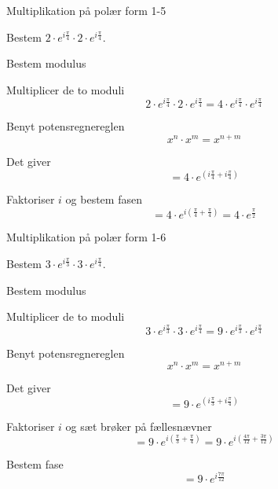 \documentclass{article}
\begin{document}
\newpage

\begin{exercise}{Multiplikation på polær form 1-5}
	
	Bestem $2 \cdot e^{i \frac{\pi}{4}} \cdot 2 \cdot e^{i \frac{\pi}{4}}$.
	
	
	
	\hint 
	
	Bestem modulus
	
	
	\hint
	
	Multiplicer de to moduli 
	\[
	2 \cdot e^{i \frac{\pi}{4}} \cdot 2 \cdot e^{i \frac{\pi}{4}} = 4 \cdot e^{i \frac{\pi}{4}} \cdot e^{i \frac{\pi}{4}}
	\]
	
	\hint 
	
	Benyt potensregnereglen
	\[
	x^n \cdot x^m = x^{n+m}
	\]
	
	\hint
	
	Det giver
	\[
	=4 \cdot e^{(i \frac{\pi}{4} + i \frac{\pi}{4})}
	\]
	
	\hint
	
	Faktoriser $i$ og bestem fasen
	\[
	= 4 \cdot e^{i( \frac{\pi}{4} +\frac{\pi}{4})} = 4 \cdot e^{\frac{\pi}{2}}
	\]
	
	
\end{exercise}


\newpage

\begin{exercise}{Multiplikation på polær form 1-6}
	
	Bestem $3 \cdot e^{i \frac{\pi}{3}} \cdot 3 \cdot e^{i \frac{\pi}{4}}$.
	
	
	
	\hint 
	
	Bestem modulus
	
	
	\hint
	
	Multiplicer de to moduli 
	\[
	3 \cdot e^{i \frac{\pi}{3}} \cdot 3 \cdot e^{i \frac{\pi}{4}} = 9 \cdot e^{i \frac{\pi}{3}}  \cdot e^{i \frac{\pi}{4}}
	\]
	
	\hint 
	
	Benyt potensregnereglen
	\[
	x^n \cdot x^m = x^{n+m}
	\]
	
	\hint
	
	Det giver
	\[
	=9 \cdot e^{(i \frac{\pi}{3}+i \frac{\pi}{4})}
	\]
	
	\hint
	
	Faktoriser $i$ og sæt brøker på fællesnævner
	\[
	= 9 \cdot e^{i( \frac{\pi}{3}+ \frac{\pi}{4})} = 9 \cdot e^{i( \frac{4 \pi}{12} + \frac{3\pi}{12})} 
	\]
	
	\hint
	
	Bestem fase
	\[
	= 9 \cdot e^{i\frac{7 \pi}{12}}
	\]
	
	
\end{exercise}
\end{document}
